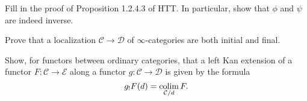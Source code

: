 \documentclass{amsart}
\begin{document}
\begin{exercise}
    Fill in the proof of Proposition 1.2.4.3 of HTT. In particular, show that $\phi$ and
    $\psi$ are indeed inverse.
\end{exercise}

\begin{exercise}
    Prove that a localization $\mathcal{C}\to \mathcal{D}$ of $\infty$-categories are
    both initial and final.
\end{exercise}

\begin{exercise}
    Show, for functors between ordinary categories, that a left Kan extension of a
    functor $F:\mathcal{C}\to \mathcal{E}$ along a functor $g:\mathcal{C}\to \mathcal{D}$
    is given by the formula
    \begin{equation*}
        g_!F(d) = \operatorname*{colim}_{\mathcal{C}/d} F.
    \end{equation*}
\end{exercise}


\newpage




\end{document}
